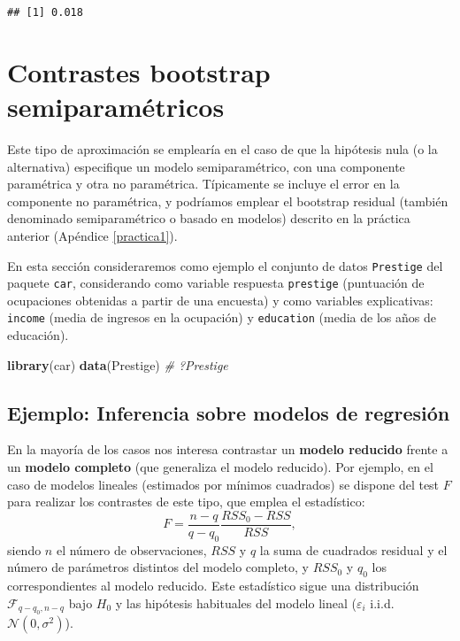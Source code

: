 \documentclass[
]{book}
\newenvironment{Shaded}{\begin{snugshade}}{\end{snugshade}}
\newcommand{\CommentTok}[1]{\textcolor[rgb]{0.56,0.35,0.01}{\textit{#1}}}
\newcommand{\KeywordTok}[1]{\textcolor[rgb]{0.13,0.29,0.53}{\textbf{#1}}}
\newcommand{\NormalTok}[1]{#1}
\theoremstyle{definition}
\theoremstyle{definition}
\theoremstyle{definition}
\theoremstyle{remark}
\begin{document}
\begin{verbatim}
## [1] 0.018
\end{verbatim}

\hypertarget{contrastes-bootstrap-semiparamuxe9tricos}{%
\section{Contrastes bootstrap semiparamétricos}\label{contrastes-bootstrap-semiparamuxe9tricos}}

Este tipo de aproximación se emplearía en el caso de que la hipótesis nula
(o la alternativa) especifique un modelo semiparamétrico,
con una componente paramétrica y otra no paramétrica.
Típicamente se incluye el error en la componente no paramétrica, y podríamos emplear
el bootstrap residual (también denominado semiparamétrico o basado en modelos)
descrito en la práctica anterior (Apéndice \ref{practica1}).

En esta sección consideraremos como ejemplo el conjunto de datos \texttt{Prestige}
del paquete \texttt{car}, considerando como variable respuesta \texttt{prestige}
(puntuación de ocupaciones obtenidas a partir de una encuesta)
y como variables explicativas: \texttt{income} (media de ingresos en la ocupación)
y \texttt{education} (media de los años de educación).

\begin{Shaded}
\begin{Highlighting}[]
\KeywordTok{library}\NormalTok{(car)}
\KeywordTok{data}\NormalTok{(Prestige)}
\CommentTok{# ?Prestige}
\end{Highlighting}
\end{Shaded}

\hypertarget{ejemplo-inferencia-sobre-modelos-de-regresiuxf3n}{%
\subsection{Ejemplo: Inferencia sobre modelos de regresión}\label{ejemplo-inferencia-sobre-modelos-de-regresiuxf3n}}

En la mayoría de los casos nos interesa contrastar un \textbf{modelo reducido}
frente a un \textbf{modelo completo} (que generaliza el modelo reducido).
Por ejemplo, en el caso de modelos lineales (estimados por mínimos cuadrados)
se dispone del test \(F\) para realizar los contrastes de este tipo,
que emplea el estadístico:
\[F=\frac{n - q}{q - q_0}\frac{RSS_0 - RSS}{RSS},\]
siendo \(n\) el número de observaciones, \(RSS\) y \(q\) la suma de cuadrados residual y
el número de parámetros distintos del modelo completo,
y \(RSS_0\) y \(q_0\) los correspondientes al modelo reducido.
Este estadístico sigue una distribución \(\mathcal{F}_{q - q_0, n - q}\)
bajo \(H_0\) y las hipótesis habituales del modelo lineal
(\(\varepsilon_i\) i.i.d. \(\mathcal{N}(0, \sigma^2)\)).
\end{document}
